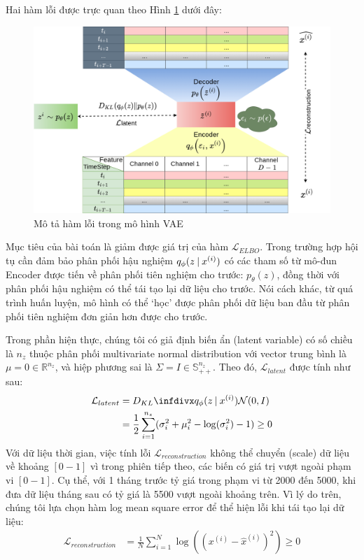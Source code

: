Hai hàm lỗi được trực quan theo Hình \ref{fig:VAE-describe} dưới đây:
\begin{figure}[H]
	\center	\includegraphics[width=1.0\textwidth]{figures/VAE/pngs/VAE_Arch_Describe.png}
	\caption{Mô tả hàm lỗi trong mô hình VAE}
	\label{fig:VAE-describe}
\end{figure}

Mục tiêu của bài toán là giảm được giá trị của hàm $\mathcal{L}_{ELBO}$. 
Trong trường hợp hội tụ cần đảm bảo phân phối hậu nghiệm $q_\phi(z \:\lvert\: x^{(i)})$ có các tham số từ mô-đun Encoder được tiến về phân phối tiên nghiệm cho trước: $p_\theta(z)$, đồng thời với phân phối hậu nghiệm có thể tái tạo lại dữ liệu cho trước. Nói cách khác, từ quá trình huấn luyện, mô hình có thể `học' được phân phối dữ liệu ban đầu từ phân phối tiên nghiệm đơn giản hơn được cho trước.

Trong phần hiện thực, chúng tôi có giả định biến ẩn (latent variable) có số chiều là $n_z$ thuộc phân phối multivariate normal distribution với vector trung bình là $\mu = 0 \in \mathbb{R}^{n_z}$, và hiệp phương sai là $\Sigma = I \in \mathbb{S}_{++}^{n_z}$. Theo đó, $ \mathcal{L}_{latent}$ được tính như sau:
\begin{align}
     \mathcal{L}_{latent} &= \Dkl{q_\phi(z \given x^{(i)})}{\mathcal{N}(0, I)}\\
     &= \frac{1}{2}\sum_{i=1}^{n_z}(\sigma_i^2 + \mu_i^2 - \log(\sigma_i^2) -1) \geq 0
\end{align}
Với dữ liệu thời gian, việc tính lỗi $\mathcal{L}_{reconstruction}$ không thể chuyển (scale) dữ liệu về khoảng $[0-1]$ vì trong phiên tiếp theo, các biến có giá trị vượt ngoài phạm vi $[0-1]$. Cụ thể, với 1 tháng trước tỷ giá trong phạm vi từ 2000 đến 5000, khi đưa dữ liệu tháng sau có tỷ giá là 5500 vượt ngoài khoảng trên. Vì lý do trên, chúng tôi lựa chọn hàm log mean square error để thể hiện lỗi khi tái tạo lại dữ liệu:
\begin{align}
     \mathcal{L}_{reconstruction} &= \frac{1}{N}\sum_{i=1}^N \log((x^{(i)} - \hat{x}^{(i)})^2) \geq 0
\end{align}

